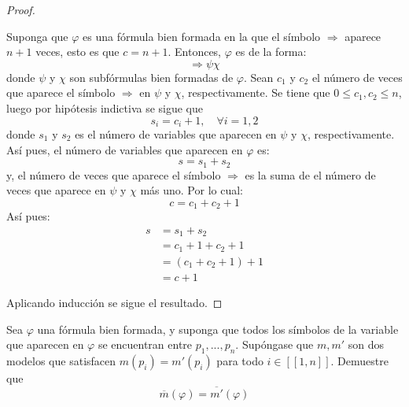 \documentclass[12pt]{report}
\newcounter{it}
\theoremstyle{largebreak}
\newcommand\natint[1]{\ensuremath{\left[\!\left[ #1\right]\!\right]}}
\begin{document}
\begin{proof}
\begin{itemize}
            Suponga que $\varphi$ es una fórmula bien formada en la que el símbolo $\Rightarrow$ aparece $n+1$ veces, esto es que $c=n+1$. Entonces, $\varphi$ es de la forma:
            \begin{equation*}
                \Rightarrow\psi\chi
            \end{equation*}
            donde $\psi$ y $\chi$ son subfórmulas bien formadas de $\varphi$. Sean $c_1$ y $c_2$ el número de veces que aparece el símbolo $\Rightarrow$ en $\psi$ y $\chi$, respectivamente. Se tiene que $0\leq c_1,c_2\leq n$, luego por hipótesis indictiva se sigue que
            \begin{equation*}
                s_i=c_i+1,\quad\forall i=1,2
            \end{equation*}
            donde $s_1$ y $s_2$ es el número de variables que aparecen en $\psi$ y $\chi$, respectivamente. Así pues, el número de variables que aparecen en $\varphi$ es:
            \begin{equation*}
                s=s_1+s_2
            \end{equation*}
            y, el número de veces que aparece el símbolo $\Rightarrow$ es la suma de el número de veces que aparece en $\psi$ y $\chi$ más uno. Por lo cual:
            \begin{equation*}
                c=c_1+c_2+1
            \end{equation*}
            Así pues:
            \begin{equation*}
                \begin{split}
                    s&=s_1+s_2\\
                    &=c_1+1+c_2+1\\
                    &=(c_1+c_2+1)+1\\
                    &=c+1
                \end{split}
            \end{equation*}
        \end{itemize}
        Aplicando inducción se sigue el resultado.
    \end{proof}

    \begin{excer}
        Sea $\varphi$ una fórmula bien formada, y suponga que todos los símbolos de la variable que aparecen en $\varphi$ se encuentran entre $p_1,...,p_n$. Supóngase que $m,m'$ son dos modelos que satisfacen $m(p_i)=m'(p_i)$ para todo $i\in\natint{1,n}$. Demuestre que
        \begin{equation*}
            \overline{m}(\varphi)=\overline{m'}(\varphi)
        \end{equation*}
    \end{excer}
\end{document}
